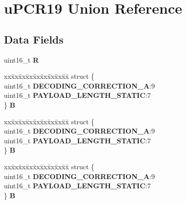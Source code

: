 \hypertarget{unionuPCR19}{}\section{u\+P\+C\+R19 Union Reference}
\label{unionuPCR19}
\subsection*{Data Fields}
\begin{DoxyCompactItemize}
\item 
\mbox{\label{unionuPCR19_a1e78fc94e4ed5f772776448357ec8396}} 
uint16\+\_\+t {\bfseries R}
\item 
\mbox{\label{unionuPCR19_ae3c59aecb06465833faaf93432932ca9}} 
\begin{tabbing}
xx\=xx\=xx\=xx\=xx\=xx\=xx\=xx\=xx\=\kill
struct \{\\
\>uint16\_t {\bfseries DECODING\_CORRECTION\_A}:9\\
\>uint16\_t {\bfseries PAYLOAD\_LENGTH\_STATIC}:7\\
\} {\bfseries B}\\

\end{tabbing}\item 
\mbox{\label{unionuPCR19_aecc09329f9097f5174be32e90e4b87e5}} 
\begin{tabbing}
xx\=xx\=xx\=xx\=xx\=xx\=xx\=xx\=xx\=\kill
struct \{\\
\>uint16\_t {\bfseries DECODING\_CORRECTION\_A}:9\\
\>uint16\_t {\bfseries PAYLOAD\_LENGTH\_STATIC}:7\\
\} {\bfseries B}\\

\end{tabbing}\item 
\mbox{\label{unionuPCR19_af848474595a39f5977cf64585d0711bf}} 
\begin{tabbing}
xx\=xx\=xx\=xx\=xx\=xx\=xx\=xx\=xx\=\kill
struct \{\\
\>uint16\_t {\bfseries DECODING\_CORRECTION\_A}:9\\
\>uint16\_t {\bfseries PAYLOAD\_LENGTH\_STATIC}:7\\
\} {\bfseries B}\\


\end{tabbing}
\end{DoxyCompactItemize}

